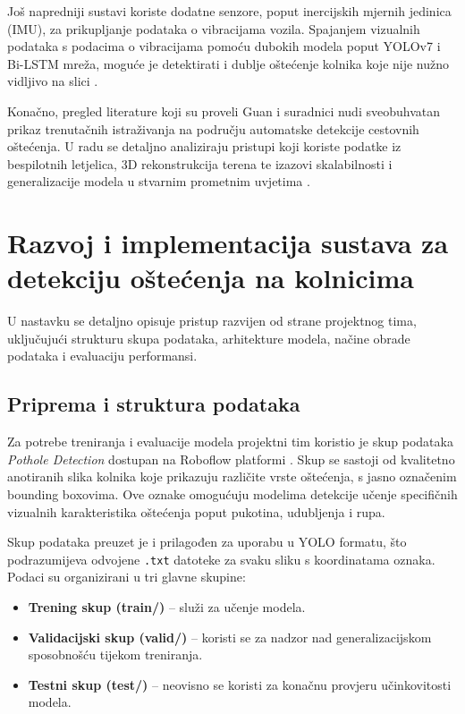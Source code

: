 \documentclass[seminarskirad]{fer}
\begin{document}
Još napredniji sustavi koriste dodatne senzore, poput inercijskih mjernih jedinica (IMU), za prikupljanje podataka o vibracijama vozila. Spajanjem vizualnih podataka s podacima o vibracijama pomoću dubokih modela poput YOLOv7 i Bi-LSTM mreža, moguće je detektirati i dublje oštećenje kolnika koje nije nužno vidljivo na slici \cite{hsieh2024}.

Konačno, pregled literature koji su proveli Guan i suradnici nudi sveobuhvatan prikaz trenutačnih istraživanja na području automatske detekcije cestovnih oštećenja. U radu se detaljno analiziraju pristupi koji koriste podatke iz bespilotnih letjelica, 3D rekonstrukcija terena te izazovi skalabilnosti i generalizacije modela u stvarnim prometnim uvjetima \cite{guan2023}.


\chapter{Razvoj i implementacija sustava za detekciju oštećenja na kolnicima}
\label{pog:razvoj}

U nastavku se detaljno opisuje pristup razvijen od strane projektnog tima, uključujući strukturu skupa podataka, arhitekture modela, načine obrade podataka i evaluaciju performansi.

\section{Priprema i struktura podataka}
\label{sec:priprema_podataka}

Za potrebe treniranja i evaluacije modela projektni tim koristio je skup podataka \textit{Pothole Detection} dostupan na Roboflow platformi \cite{roboflow_pothole}. Skup se sastoji od kvalitetno anotiranih slika kolnika koje prikazuju različite vrste oštećenja, s jasno označenim bounding boxovima. Ove oznake omogućuju modelima detekcije učenje specifičnih vizualnih karakteristika oštećenja poput pukotina, udubljenja i rupa.

Skup podataka preuzet je i prilagođen za uporabu u YOLO formatu, što podrazumijeva odvojene \texttt{.txt} datoteke za svaku sliku s koordinatama oznaka. Podaci su organizirani u tri glavne skupine:

\begin{itemize}
    \item \textbf{Trening skup (train/)} – služi za učenje modela.
    \item \textbf{Validacijski skup (valid/)} – koristi se za nadzor nad generalizacijskom sposobnošću tijekom treniranja.
    \item \textbf{Testni skup (test/)} – neovisno se koristi za konačnu provjeru učinkovitosti modela.
\end{itemize}
\end{document}
